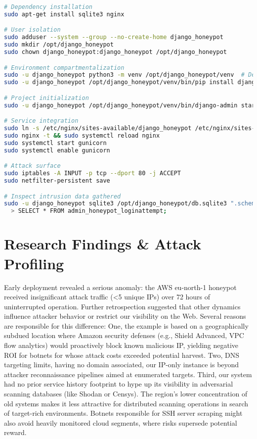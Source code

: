 \documentclass{cls/ULBreport}
\begin{document}
\begin{lstlisting}[language=bash,label={lst:cowrie-context},caption={Setup of a Django Honeypot Webservice}]  
# Dependency installation
sudo apt-get install sqlite3 nginx

# User isolation
sudo adduser --system --group --no-create-home django_honeypot
sudo mkdir /opt/django_honeypot
sudo chown django_honeypot:django_honeypot /opt/django_honeypot

# Environment compartmentalization
sudo -u django_honeypot python3 -m venv /opt/django_honeypot/venv  # Dependency isolation
sudo -u django_honeypot /opt/django_honeypot/venv/bin/pip install django django-admin-honeypot gunicorn

# Project initialization
sudo -u django_honeypot /opt/django_honeypot/venv/bin/django-admin startproject honeypot_project /opt/django_honeypot

# Service integration
sudo ln -s /etc/nginx/sites-available/django_honeypot /etc/nginx/sites-enabled/ # Exposure
sudo nginx -t && sudo systemctl reload nginx
sudo systemctl start gunicorn
sudo systemctl enable gunicorn

# Attack surface
sudo iptables -A INPUT -p tcp --dport 80 -j ACCEPT
sudo netfilter-persistent save

# Inspect intrusion data gathered
sudo -u django_honeypot sqlite3 /opt/django_honeypot/db.sqlite3 ".schema admin_honeypot_loginattempt"  # Verify capture schema
  > SELECT * FROM admin_honeypot_loginattempt;\end{lstlisting}  


\section{Research Findings \& Attack Profiling}
 
Early deployment revealed a serious anomaly: the AWS eu-north-1 honeypot received insignificant attack traffic (<5 unique IPs) over 72 hours of uninterrupted operation. Further retrospection suggested that other dynamics influence attacker behavior or restrict our visibility on the Web. Several reasons are responsible for this difference: One, the example is based on a geographically subdued location where Amazon security defenses (e.g., Shield Advanced, VPC flow analytics) would proactively block known malicious IP, yielding negative ROI for botnets for whose attack costs exceeded potential harvest. Two, DNS targeting limits, having no domain associated, our IP-only instance is beyond attacker reconnaissance pipelines aimed at enumerated targets. Third, our system had no prior service history footprint to hype up its visibility in adversarial scanning databases (like Shodan or Censys). The region's lower concentration of old systems makes it less attractive for distributed scanning operations in search of target-rich environments. Botnets responsible for SSH server scraping might also avoid heavily monitored cloud segments, where risks supersede potential reward. 
\end{document}
